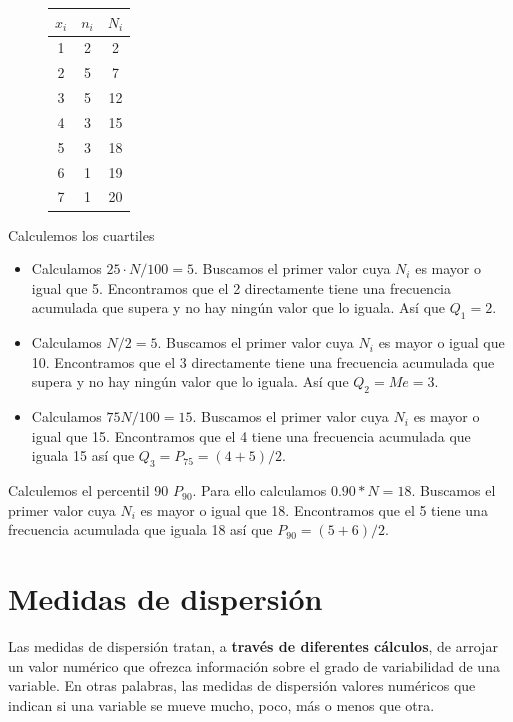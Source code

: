 \documentclass[]{article}
\theoremstyle{plain}
\theoremstyle{definition}
\theoremstyle{definition} %
\begin{document}
\begin{figure}
  \centering
\begin{tabular}{ccc}
\(x_i\) & \(n_i\) & \(N_i\)\\
\hline
1 & 2 & 2 \\
2 & 5 & 7 \\
3 & 5 & 12\\
4 & 3 & 15\\
5 & 3 & 18\\
6 & 1 & 19\\
7 & 1 & 20\\
\end{tabular}
\end{figure}

Calculemos los cuartiles

\begin{itemize}
\item
  Calculamos \(25 \cdot N / 100 = 5\). Buscamos el primer valor cuya
  \(N_i\) es mayor o igual que 5. Encontramos que el 2 directamente
  tiene una frecuencia acumulada que supera y no hay ningún valor que lo
  iguala. Así que \(Q_1 = 2\).
\item
  Calculamos \(N/2 = 5\). Buscamos el primer valor cuya \(N_i\) es mayor
  o igual que 10. Encontramos que el 3 directamente tiene una frecuencia
  acumulada que supera y no hay ningún valor que lo iguala. Así que
  \(Q_2 = Me = 3\).
\item
  Calculamos \(75 N/100 = 15\). Buscamos el primer valor cuya \(N_i\) es
  mayor o igual que 15. Encontramos que el 4 tiene una frecuencia
  acumulada que iguala 15 así que \(Q_3 = P_{75} = (4+5)/2\).
\end{itemize}

Calculemos el percentil 90 \(P_{90}\). Para ello calculamos
\(0.90*N = 18\). Buscamos el primer valor cuya \(N_i\) es mayor o igual
que 18. Encontramos que el 5 tiene una frecuencia acumulada que iguala
18 así que \(P_{90} = (5+6)/2\).

\hypertarget{medidas-de-dispersiuxf3n}{%
\section{Medidas de dispersión}\label{medidas-de-dispersiuxf3n}}

Las medidas de dispersión tratan, a \textbf{través de diferentes
cálculos}, de arrojar un valor numérico que ofrezca información sobre el
grado de variabilidad de una variable. En otras palabras, las medidas de
dispersión valores numéricos que indican si una variable se mueve mucho,
poco, más o menos que otra.
\end{document}
